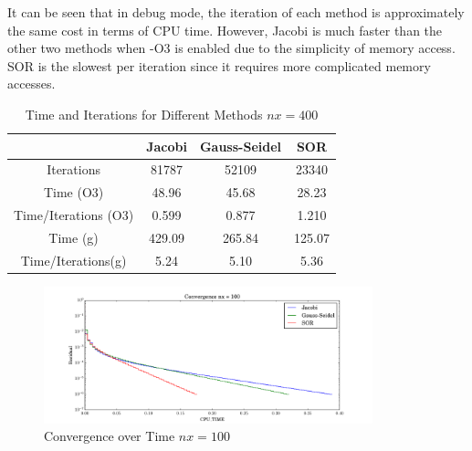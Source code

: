 \documentclass[letterpaper,12pt,]{article}
\begin{document}
It can be seen that in debug mode, the iteration of each method is approximately the same cost in terms of CPU time.
However, Jacobi is much faster than the other two methods when -O3 is enabled due to the simplicity of memory access. SOR is the slowest per iteration since it requires more complicated memory accesses.

\begin{table}[h]
\centering
\begin{tabular}{cccc} \toprule
    {} & {Jacobi} & {Gauss-Seidel} & {SOR}\\ \midrule
    {Iterations} & 81787 & 52109 & 23340\\
    {Time (O3)} & 48.96 & 45.68 & 28.23\\
    {Time/Iterations (O3)} & 0.599 & 0.877 & 1.210\\
    {Time (g)} & 429.09 & 265.84 & 125.07\\
    {Time/Iterations(g)} & 5.24 & 5.10 & 5.36\\
\bottomrule
\end{tabular}
\caption{Time and Iterations for Different Methods $nx = 400$}
\label{tab2}
\end{table}

\begin{figure}[!h]
    \centering
    \includegraphics[width = 0.85\textwidth]{./Figures/time100.pdf}
    \caption{Convergence over Time $nx = 100$}
    \label{fig:time100}
\end{figure}
\end{document}
